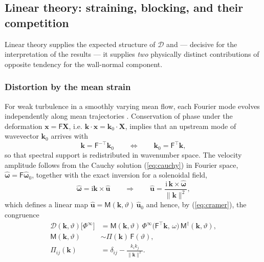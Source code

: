 \documentclass[lineno]{JFM-FLM_Au}
\begin{document}
\subsection{Linear theory: straining, blocking, and their competition}
\label{sec:framework_rdt}

Linear theory supplies the expected structure of $\mathcal{D}$ and ---
decisive for the interpretation of the results --- it supplies \emph{two}
physically distinct contributions of opposite tendency for the wall-normal
component.

\subsubsection{Distortion by the mean strain}

For weak turbulence in a smoothly varying mean flow, each Fourier mode
evolves independently along mean trajectories
\citep{BatchelorProudman1954}. Conservation of phase under the deformation
$\boldsymbol{x} = \mathsf{F}\boldsymbol{X}$, i.e.
$\boldsymbol{k}\cdot\boldsymbol{x} = \boldsymbol{k}_0\cdot\boldsymbol{X}$,
implies that an upstream mode of wavevector $\boldsymbol{k}_0$ arrives
with
\begin{equation}
  \boldsymbol{k} = \mathsf{F}^{-\top}\boldsymbol{k}_0
  \qquad\Longleftrightarrow\qquad
  \boldsymbol{k}_0 = \mathsf{F}^{\top}\boldsymbol{k},
  \label{eq:kvec}
\end{equation}
so that spectral support is redistributed in wavenumber space. The
velocity amplitude follows from the Cauchy solution (\ref{eq:cauchy}) in
Fourier space,
$\hat{\boldsymbol{\omega}} = \mathsf{F}\hat{\boldsymbol{\omega}}_0$,
together with the exact inversion for a solenoidal field,
\begin{equation}
  \hat{\boldsymbol{\omega}}
  = \mathrm{i}\boldsymbol{k}\times\hat{\boldsymbol{u}}
  \qquad\Longrightarrow\qquad
  \hat{\boldsymbol{u}}
  = \frac{\mathrm{i}\,\boldsymbol{k}\times\hat{\boldsymbol{\omega}}}
         {\|\boldsymbol{k}\|^{2}},
  \label{eq:biot_savart}
\end{equation}
which defines a linear map
$\hat{\boldsymbol{u}} = \mathsf{M}(\boldsymbol{k},\vartheta)\,
\hat{\boldsymbol{u}}_0$ and hence, by (\ref{eq:cramer}), the congruence
\begin{equation}
\begin{aligned}
\mathcal{D}(\boldsymbol{k},\vartheta)\big[\Phi^{\infty}\big]
&=
\mathsf{M}(\boldsymbol{k},\vartheta)\,
\Phi^{\infty}\!\big(\mathsf{F}^{\top}\boldsymbol{k},\,\omega\big)\,
\mathsf{M}^{\dagger}(\boldsymbol{k},\vartheta),
\\[1mm]
\mathsf{M}(\boldsymbol{k},\vartheta)
&\sim
\Pi(\boldsymbol{k})\,\mathsf{F}(\vartheta),
\\[1mm]
\Pi_{ij}(\boldsymbol{k})
&=
\delta_{ij}
-
\frac{k_i k_j}{\|\boldsymbol{k}\|^{2}} .
\end{aligned}
\label{eq:rdt_structure}
\end{equation}
\end{document}
